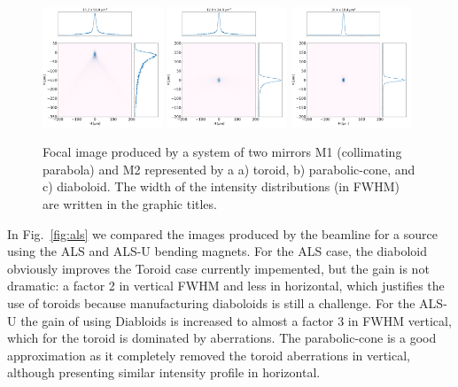 \documentclass{iucr}              %
\begin{document}
\begin{figure}
\includegraphics[width=0.32\textwidth]{figures/alsu_toroid.png}
\includegraphics[width=0.32\textwidth]{figures/alsu_parabolic-cone.png}
\includegraphics[width=0.32\textwidth]{figures/alsu_diaboloid.png}
\caption{Focal image produced by a system of two mirrors M1 (collimating parabola) and M2 represented by a a) toroid, b) parabolic-cone, and c) diaboloid. The width of the intensity distributions (in FWHM) are written in the graphic titles. 
}
\end{figure}

In Fig.~\ref{fig:als} we compared the images produced by the beamline for a source using the ALS and ALS-U bending magnets. For the ALS case, the diaboloid obviously improves the Toroid case currently impemented, but the gain is not dramatic: a factor 2 in vertical FWHM and less in horizontal, which justifies the use of toroids because manufacturing diaboloids is still a challenge. For the ALS-U the gain of using Diabloids is increased to almost a factor 3 in FWHM vertical, which for the toroid is dominated by aberrations. The parabolic-cone is a good approximation as it completely removed the toroid aberrations in vertical, although presenting similar intensity profile in horizontal.
\end{document}
